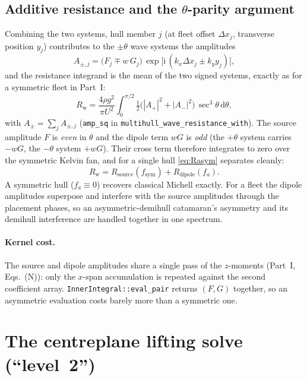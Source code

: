 \documentclass[11pt]{article}
\newcommand{\ii}{\mathrm{i}}
\newcommand{\dd}{\,\mathrm{d}}
\newcommand{\Rw}{R_{\mathrm{w}}}
\begin{document}
\subsection{Additive resistance and the $\theta$-parity argument}
\label{sec:parity}

Combining the two systems, hull member $j$ (at fleet offset $\Delta x_j$,
transverse position $y_j$) contributes to the $\pm\theta$ wave systems the
amplitudes
\begin{equation}
  A_{\pm,j} = \bigl(F_j \mp w\,G_j\bigr)\,
    \exp\!\bigl[\ii\,(k_x\Delta x_j \pm k_y y_j)\bigr],
\end{equation}
and the resistance integrand is the mean of the two signed systems, exactly as
for a symmetric fleet in Part~I:
\begin{equation}
  \Rw = \frac{4\rho g^2}{\pi U^2}\int_0^{\pi/2}
    \tfrac12\bigl(|A_+|^2 + |A_-|^2\bigr)\,\sec^3\theta\dd\theta,
  \label{eq:Rasym}
\end{equation}
with $A_\pm = \sum_j A_{\pm,j}$ (\texttt{amp\_sq} in
\texttt{multihull\_wave\_resistance\_with}). The source amplitude $F$ is
\emph{even} in $\theta$ and the dipole term $wG$ is \emph{odd} (the $+\theta$
system carries $-wG$, the $-\theta$ system $+wG$). Their cross term therefore
integrates to zero over the symmetric Kelvin fan, and for a single hull
\eqref{eq:Rasym} separates cleanly:
\begin{equation}
  \boxed{\;\Rw = R_{\mathrm{source}}(f_{\mathrm{sym}})
    + R_{\mathrm{dipole}}(f_a).\;}
  \label{eq:additive}
\end{equation}
A symmetric hull ($f_a\equiv 0$) recovers classical Michell exactly. For a fleet
the dipole amplitudes superpose and interfere with the source amplitudes through
the placement phases, so an asymmetric-demihull catamaran's asymmetry and its
demihull interference are handled together in one spectrum.

\paragraph{Kernel cost.} The source and dipole amplitudes share a single pass of
the $z$-moments (Part~I, Eqs.~(N)): only the $x$-span accumulation is repeated
against the second coefficient array. \texttt{InnerIntegral::eval\_pair} returns
$(F, G)$ together, so an asymmetric evaluation costs barely more than a
symmetric one.

\section{The centreplane lifting solve (``level~2'')}
\label{sec:lifting}
\end{document}
